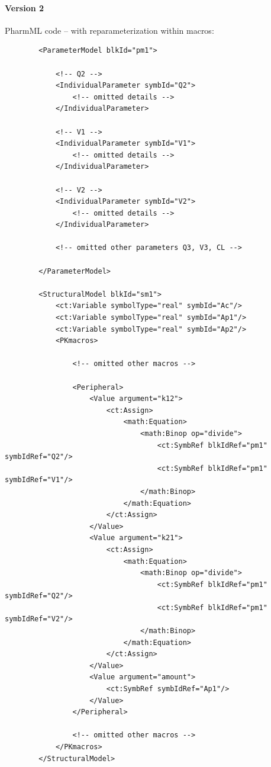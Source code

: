 \paragraph{Version 2}
PharmML code -- with reparameterization within macros:
\lstset{language=XML}
\begin{lstlisting}
        <ParameterModel blkId="pm1">
            
            <!-- Q2 -->
            <IndividualParameter symbId="Q2">
                <!-- omitted details -->
            </IndividualParameter>
            
            <!-- V1 -->
            <IndividualParameter symbId="V1">
                <!-- omitted details -->
            </IndividualParameter>
            
            <!-- V2 -->
            <IndividualParameter symbId="V2">
                <!-- omitted details -->
            </IndividualParameter>
            
            <!-- omitted other parameters Q3, V3, CL -->
            
        </ParameterModel>

        <StructuralModel blkId="sm1">
            <ct:Variable symbolType="real" symbId="Ac"/>
            <ct:Variable symbolType="real" symbId="Ap1"/>
            <ct:Variable symbolType="real" symbId="Ap2"/>
            <PKmacros>
            
                <!-- omitted other macros -->

                <Peripheral>
                    <Value argument="k12">
                        <ct:Assign>
                            <math:Equation>
                                <math:Binop op="divide">
                                    <ct:SymbRef blkIdRef="pm1" symbIdRef="Q2"/>
                                    <ct:SymbRef blkIdRef="pm1" symbIdRef="V1"/>
                                </math:Binop>
                            </math:Equation>
                        </ct:Assign>
                    </Value>
                    <Value argument="k21">
                        <ct:Assign>
                            <math:Equation>
                                <math:Binop op="divide">
                                    <ct:SymbRef blkIdRef="pm1" symbIdRef="Q2"/>
                                    <ct:SymbRef blkIdRef="pm1" symbIdRef="V2"/>
                                </math:Binop>
                            </math:Equation>
                        </ct:Assign>
                    </Value>
                    <Value argument="amount">
                        <ct:SymbRef symbIdRef="Ap1"/>
                    </Value>
                </Peripheral>

                <!-- omitted other macros -->
            </PKmacros>
        </StructuralModel>
\end{lstlisting}



